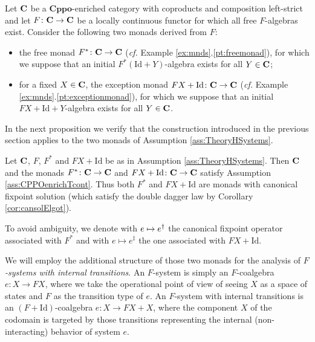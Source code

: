\documentclass[oribibl,envcountsame,envcountsect,runningheads]{llncs}
\newcommand{\cat}[1]{\ensuremath{\mathbf{#1}}}
\newcommand{\free}[1]{{#1^*}}
\newcommand{\cppo}{\cat{Cppo}}
\renewcommand{\>}{\rangle}
\def\Id{\mathrm{Id}}
\def\altsol#1{{#1}^\ddag}
\def\:{\colon}
\def\GF{F} \def\GFG{G} \def\MM{R} \def\quot{\xi} \def\quotG{\gamma}
\begin{document}
\begin{assumption} \label{ass:TheoryHSystems} Let $\C$ be a \cppo-enriched category with coproducts and composition left-strict and let $\GF \colon \C \to \C$ be a locally continuous functor for which all free $\GF$-algebras exist. Consider the following two monads derived from $\GF$:
\begin{itemize}
  \item the free monad $\free{\GF} \colon \C \to \C$ (\emph{cf.} Example \ref{ex:mnds}.\ref{pt:freemonad}), for which we suppose that an initial $\free{\GF}(\Id +Y)$-algebra exists for all $Y\in\C$;
  \item for a fixed $X \in \C$, the exception monad $\GF X + \Id \colon \C \to \C$ (\emph{cf.} Example \ref{ex:mnds}.\ref{pt:exceptionmonad}), for which we suppose that an initial $\GF  X+\Id +Y$-algebra exists for all $Y\in\C$.
\end{itemize}
\end{assumption}
In the next proposition we verify that the construction introduced in the previous section applies to the two monads of Assumption \ref{ass:TheoryHSystems}.
\newcommand{\propass}{Let $\C$, $\GF $,  $\free{\GF }$ and  $\GF X + \Id$ be as in Assumption \ref{ass:TheoryHSystems}. Then $\C$ and the monads $\free{\GF }\colon \C \to \C$ and $\GF X + \Id \colon \C \to \C$ satisfy Assumption \ref{ass:CPPOenrichTcont}. Thus both $\free{\GF }$ and  $\GF X + \Id$ are monads with canonical fixpoint solution (which satisfy the double dagger law by Corollary \ref{cor:cansolElgot}).}
 \begin{proposition}\label{prop:ass2->ass1}
 \propass
 \end{proposition}
To avoid ambiguity, we denote with $e \mapsto {e}^\dag$ the canonical fixpoint operator associated with $\free{\GF }$ and with $e \mapsto \altsol e$ the one associated with $\GF X + \Id$.

We will employ the additional structure of those two monads for the analysis of \emph{$\GF $-systems with internal transitions}. An $\GF $-system is simply an $\GF $-coalgebra $e\: X \to \GF X$, where we take the operational point of view of seeing $X$ as a space of states and $\GF $ as the transition type of $e$. An $\GF $-system with internal transitions is an $(\GF  + \Id)$-coalgebra $e \: X \to \GF X +X$, where the component $X$ of the codomain is targeted by those transitions representing the internal (non-interacting) behavior of system $e$.
\end{document}
